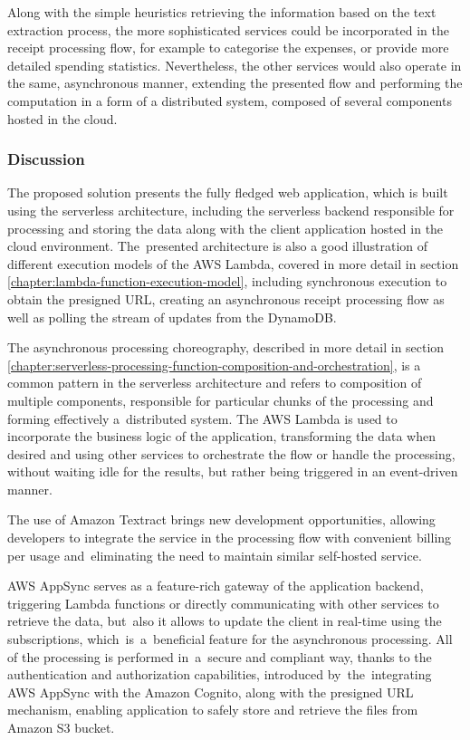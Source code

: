 Along with the simple heuristics retrieving the information based on the text extraction process, the more sophisticated services could be incorporated in the receipt processing flow, for example to categorise the expenses, or provide more detailed spending statistics. Nevertheless, the other services would also operate in the same, asynchronous manner, extending the presented flow and performing the computation in a form of a distributed system, composed of several components hosted in the cloud.

\subsubsection{Discussion}

The proposed solution presents the fully fledged web application, which is built using the serverless architecture, including the serverless backend responsible for processing and storing the data along with the client application hosted in the cloud environment.
The~presented architecture is also a good illustration of different execution models of the AWS Lambda, covered in more detail in section \ref{chapter:lambda-function-execution-model}, including synchronous execution to obtain the presigned URL, creating an asynchronous receipt processing flow as well as polling the stream of updates from the DynamoDB.

The asynchronous processing choreography, described in more detail in section \ref{chapter:serverless-processing-function-composition-and-orchestration}, is a common pattern in the serverless architecture and refers to composition of multiple components, responsible for particular chunks of the processing and forming effectively a~distributed system.
The AWS Lambda is used to incorporate the business logic of the application, transforming the data when desired and using other services to orchestrate the flow or handle the processing, without waiting idle for the results, but rather being triggered in an event-driven manner.

The use of Amazon Textract brings new development opportunities, allowing developers to integrate the service in the processing flow with convenient billing per usage and~eliminating the need to maintain similar self-hosted service.

AWS AppSync serves as a feature-rich gateway of the application backend, triggering Lambda functions or directly communicating with other services to retrieve the data, but~also it allows to update the client in real-time using the subscriptions, which~is~a~beneficial feature for the asynchronous processing.
All of the processing is performed in~a~secure and compliant way, thanks to the authentication and authorization capabilities, introduced by~the~integrating AWS AppSync with the Amazon Cognito, along with the presigned URL mechanism, enabling application to safely store and retrieve the files from Amazon S3 bucket.

